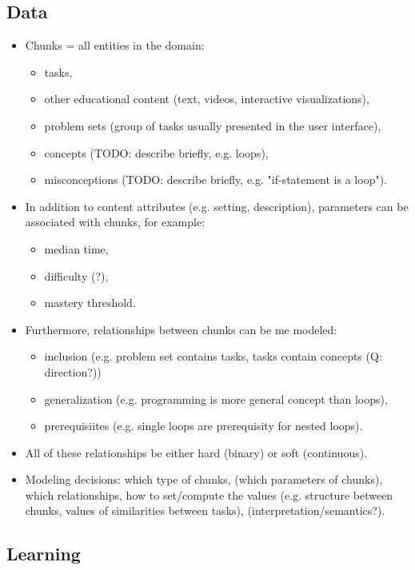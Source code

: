 \subsection{Data}  %

\begin{itemize}
\item Chunks = all entities in the domain:
\begin{itemize}
\item tasks,
\item other educational content (text, videos, interactive visualizations),
\item problem sets (group of tasks usually presented in the user interface),
\item concepts (TODO: describe briefly, e.g. loops),
\item misconceptions (TODO: describe briefly, e.g. "if-statement is a loop").
\end{itemize}
\item In addition to content attributes (e.g. setting, description),
    parameters can be associated with chunks, for example:
\begin{itemize}
\item median time,
\item difficulty (?),
\item mastery threshold.
\end{itemize}
\item Furthermore, relationships between chunks can be me modeled:
\begin{itemize}
\item inclusion (e.g. problem set contains tasks, tasks contain concepts (Q: direction?))
\item generalization (e.g. programming is more general concept than loops),
\item prerequisiites (e.g. single loops are prerequisity for nested loops).
\end{itemize}
\item All of these relationships be either hard (binary) or soft (continuous).
\item Modeling decisions: which type of chunks, (which parameters of chunks),
  which relationships, how to set/compute the values (e.g. structure between
  chunks, values of similarities between tasks), (interpretation/semantics?).
\end{itemize}

\subsection{Learning}

